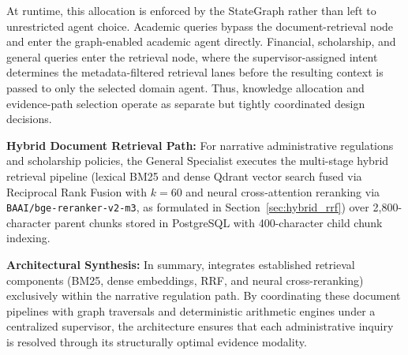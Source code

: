 \begin{table}[!htbp]
\centering
\caption{Decision criteria mapping query characteristics to evidence representation mechanisms.}
\label{tab:decision_criteria}
\end{table}

At runtime, this allocation is enforced by the StateGraph rather than left to unrestricted agent choice. Academic queries bypass the document-retrieval node and enter the graph-enabled academic agent directly. Financial, scholarship, and general queries enter the retrieval node, where the supervisor-assigned intent determines the metadata-filtered retrieval lanes before the resulting context is passed to only the selected domain agent. Thus, knowledge allocation and evidence-path selection operate as separate but tightly coordinated design decisions.

\noindent\textbf{Hybrid Document Retrieval Path:} For narrative administrative regulations and scholarship policies, the General Specialist executes the multi-stage hybrid retrieval pipeline (lexical BM25 and dense Qdrant vector search fused via Reciprocal Rank Fusion with $k=60$ and neural cross-attention reranking via \texttt{BAAI/bge-reranker-v2-m3}, as formulated in Section~\ref{sec:hybrid_rrf}) over 2,800-character parent chunks stored in PostgreSQL with 400-character child chunk indexing.

\textbf{Architectural Synthesis:} In summary, \system{} integrates established retrieval components (BM25, dense embeddings, RRF, and neural cross-reranking) exclusively within the narrative regulation path. By coordinating these document pipelines with graph traversals and deterministic arithmetic engines under a centralized supervisor, the architecture ensures that each administrative inquiry is resolved through its structurally optimal evidence modality.
